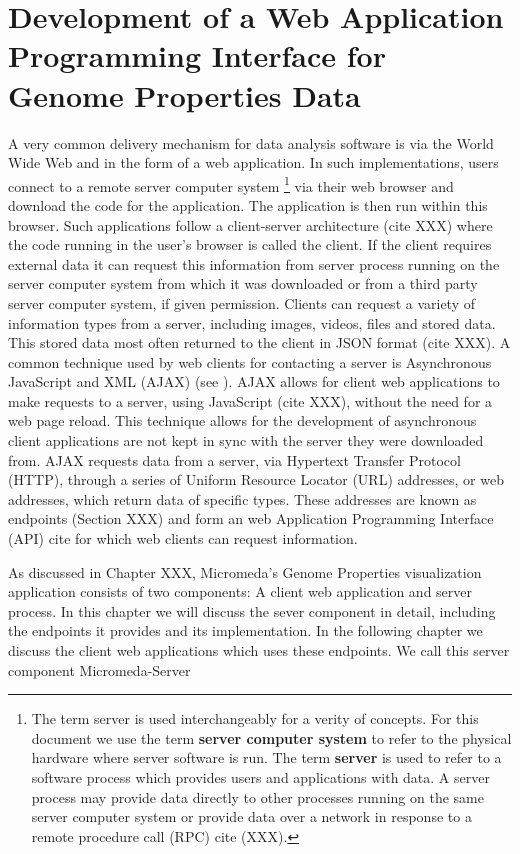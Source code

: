 \chapter{Development of a Web Application Programming Interface for Genome Properties Data}

A very common delivery mechanism for data analysis software is via the World Wide Web and in the form of a web application. In such implementations, users connect to a remote server computer system \footnote{The term server is used interchangeably for a verity of concepts. For this document we use the term \textbf{server computer system} to refer to the physical hardware where server software is run. The term \textbf{server} is used to refer to a software process which provides users and applications with data. A server process may provide data directly to other processes running on the same server computer system or provide data over a network in response to a remote procedure call (RPC) cite (XXX).} via their web browser and download the code for the application. The application is then run within this browser. Such applications follow a client-server architecture (cite XXX) where the code running in the user's browser is called the client. If the client requires external data it can request this information from server process running on the server computer system from which it was downloaded or from a third party server computer system, if given permission. Clients can request a variety of information types from a server, including images, videos, files and stored data. This stored data most often returned to the client in JSON format (cite XXX). A common technique used by web clients for contacting a server is Asynchronous JavaScript and XML (AJAX) \cite{XXX} (see \href{}{}). AJAX allows for client web applications to make requests to a server, using JavaScript (cite XXX), without the need for a web page reload. This technique allows for the development of asynchronous client applications are not kept in sync with the server they were downloaded from. AJAX requests data from a server, via Hypertext Transfer Protocol (HTTP), through a series of Uniform Resource Locator (URL) addresses, or web addresses, which return data of specific types. These addresses are known as endpoints (Section XXX) and form an web Application Programming Interface (API) cite{} for which web clients can request information.

As discussed in Chapter XXX, Micromeda's Genome Properties visualization application consists of two components: A client web application and server process. In this chapter we will discuss the sever component in detail, including the endpoints it provides and its implementation. In the following chapter we discuss the client web applications which uses these endpoints. We call this server component Micromeda-Server

